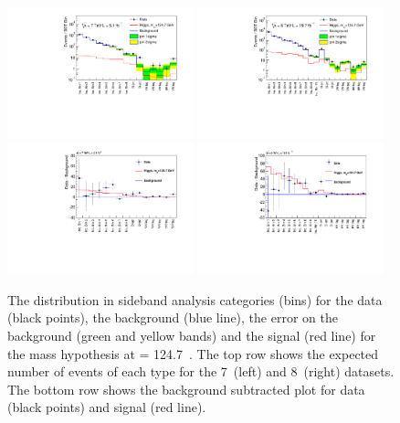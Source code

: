 \begin{figure}
  \includegraphics[width=0.48\textwidth]{analysis/plots/sideband/sideband_model_bfmass_7TeV.pdf}
  \includegraphics[width=0.48\textwidth]{analysis/plots/sideband/sideband_model_bfmass_8TeV.pdf}
  \includegraphics[width=0.48\textwidth]{analysis/plots/sideband/sideband_model_bfmass_7TeV_diff.pdf}
  \includegraphics[width=0.48\textwidth]{analysis/plots/sideband/sideband_model_bfmass_8TeV_diff.pdf}
  \caption[The distribution of data, background and signal for the \acs{SMVA}]{The distribution in sideband analysis categories (bins) for the data (black points), the background (blue line), the error on the background (green and yellow bands) and the signal (red line) for the mass hypothesis at \mH= 124.7~\GeV. The top row shows the expected number of events of each type for the 7~\TeV (left) and 8~\TeV (right) datasets. The bottom row shows the background subtracted plot for data (black points) and signal (red line).}
  \label{fig:sideband_output}
\end{figure}

